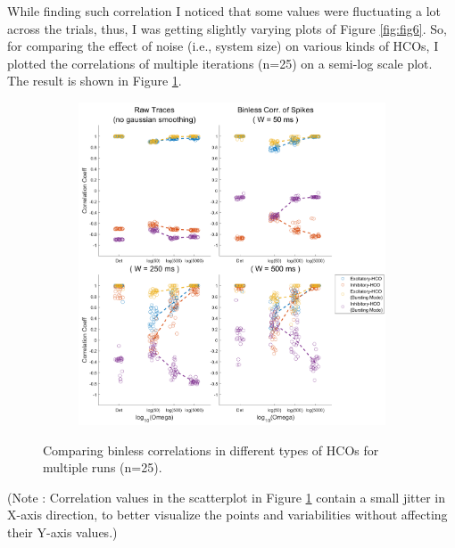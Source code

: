 \documentclass[
]{article}
\begin{document}
While finding such correlation I noticed that some values were fluctuating a lot across the trials, thus, I was getting slightly varying plots of Figure \ref{fig:fig6}. So, for comparing the effect of noise (i.e., system size) on various kinds of HCOs, I plotted the correlations of multiple iterations (n=25) on a semi-log scale plot. The result is shown in Figure \ref{fig:fig7}.

\begin{figure}
  \centering
  \begin{subfigure}[b]{\textwidth}
    \centering
    \includegraphics[width=\textwidth]{figs/F7_HCO_BLCorr_omega.png}
  \end{subfigure}
  \vspace{-0.5cm}
  \caption{Comparing binless correlations in different types of HCOs for multiple runs (n=25).}  \label{fig:fig7}
\end{figure}

(Note : Correlation values in the scatterplot in Figure \ref{fig:fig7} contain a small jitter in X-axis direction, to better visualize the points and variabilities without affecting their Y-axis values.)
\end{document}
